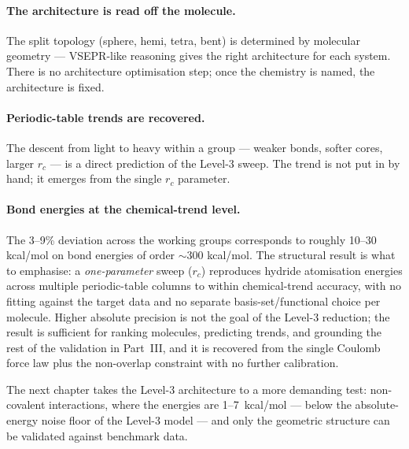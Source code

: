 \paragraph{The architecture is read off the molecule.} The split topology (sphere, hemi, tetra, bent) is determined by molecular geometry --- VSEPR-like reasoning gives the right architecture for each system. There is no architecture optimisation step; once the chemistry is named, the architecture is fixed.

\paragraph{Periodic-table trends are recovered.} The descent from light to heavy within a group --- weaker bonds, softer cores, larger $r_c$ --- is a direct prediction of the Level-3 sweep. The trend is not put in by hand; it emerges from the single $r_c$ parameter.

\paragraph{Bond energies at the chemical-trend level.} The 3--9\% deviation across the working groups corresponds to roughly 10--30 kcal/mol on bond energies of order $\sim$300 kcal/mol. The structural result is what to emphasise: a \emph{one-parameter} sweep ($r_c$) reproduces hydride atomisation energies across multiple periodic-table columns to within chemical-trend accuracy, with no fitting against the target data and no separate basis-set/functional choice per molecule. Higher absolute precision is not the goal of the Level-3 reduction; the result is sufficient for ranking molecules, predicting trends, and grounding the rest of the validation in Part~III, and it is recovered from the single Coulomb force law plus the non-overlap constraint with no further calibration.

The next chapter takes the Level-3 architecture to a more demanding test: non-covalent interactions, where the energies are 1--7~kcal/mol --- below the absolute-energy noise floor of the Level-3 model --- and only the geometric structure can be validated against benchmark data.

